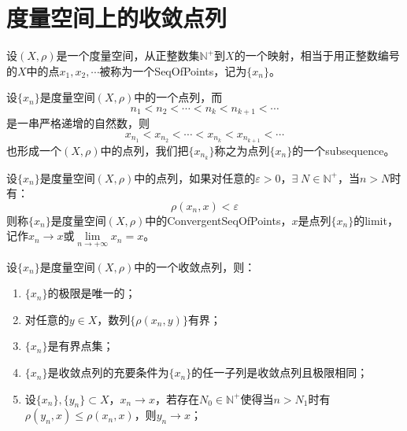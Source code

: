 \section{度量空间上的收敛点列}
\begin{definition}
	设$(X,\rho)$是一个度量空间，从正整数集$\mathbb{N}^+$到$X$的一个映射，相当于用正整数编号的$X$中的点$x_1,x_2,\cdots$被称为一个\gls{SeqOfPoints}，记为$\{x_n\}$。
\end{definition}
\begin{definition}
	设$\{x_n\}$是度量空间$(X,\rho)$中的一个点列，而
	\begin{equation*}
		n_1<n_2<\cdots<n_k<n_{k+1}<\cdots
	\end{equation*}
	是一串严格递增的自然数，则
	\begin{equation*}
		x_{n_1}<x_{n_2}<\cdots<x_{n_k}<x_{n_{k+1}}<\cdots
	\end{equation*}
	也形成一个$(X,\rho)$中的点列，我们把$\{x_{n_k}\}$称之为点列$\{x_n\}$的一个\gls{subsequence}。
\end{definition}
\begin{definition}
	设$\{x_n\}$是度量空间$(X,\rho)$中的点列，如果对任意的$\varepsilon>0$，$\exists\; N\in\mathbb{N}^+$，当$n>N$时有：
	\begin{equation*}
		\rho(x_n,x)<\varepsilon
	\end{equation*}
	则称$\{x_n\}$是度量空间$(X,\rho)$中的\gls{ConvergentSeqOfPoints}，$x$是点列$\{x_n\}$的\gls{limit}，记作$x_n\to x$或$\lim\limits_{n\to+\infty}x_n=x$。
\end{definition}
\begin{property}
	设$\{x_n\}$是度量空间$(X,\rho)$中的一个收敛点列，则：
	\begin{enumerate}
		\item $\{x_n\}$的极限是唯一的；
		\item 对任意的$ y\in X$，数列$\{\rho(x_n,y)\}$有界；
		\item $\{x_n\}$是有界点集；
		\item $\{x_n\}$是收敛点列的充要条件为$\{x_n\}$的任一子列是收敛点列且极限相同；
		\item 设$\{x_n\},\{y_n\}\subset X$，$x_n\to x$，若存在$N_0\in\mathbb{N}^+$使得当$n>N_1$时有$\rho(y_n,x)\leqslant\rho(x_n,x)$，则$y_n\to x$；
	\end{enumerate}
\end{property}
